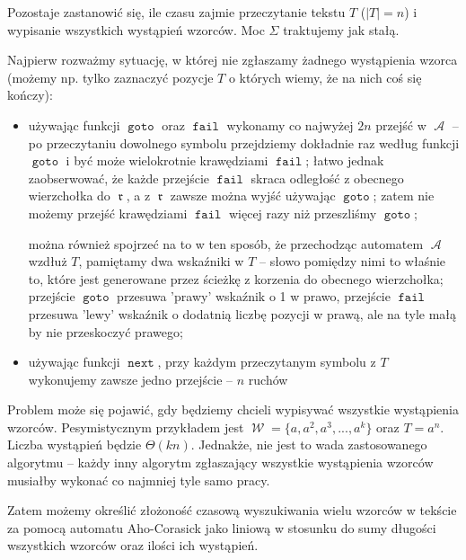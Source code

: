 \documentclass{article}
\DeclareMathOperator{\rot}{\mathfrak{r}}
\DeclareMathOperator{\W}{\mathcal{W}}
\DeclareMathOperator{\A}{\mathcal{A}}
\DeclareMathOperator{\goto}{\texttt{goto}}
\DeclareMathOperator{\next}{\texttt{next}}
\DeclareMathOperator{\fail}{\texttt{fail}}
\begin{document}
Pozostaje zastanowić się, ile czasu zajmie przeczytanie tekstu $T$ ($|T|=n$) i wypisanie wszystkich wystąpień wzorców. Moc $\Sigma$ traktujemy jak stałą.

Najpierw rozważmy sytuację, w której nie zgłaszamy żadnego wystąpienia wzorca (możemy np. tylko zaznaczyć pozycje $T$ o których wiemy, że na nich coś się kończy):
\begin{itemize}
    \item używając funkcji $\goto$ oraz $\fail$ wykonamy co najwyżej $2n$ przejść w $\A$ -- po przeczytaniu dowolnego symbolu przejdziemy dokładnie raz według funkcji $\goto$ i być może wielokrotnie krawędziami $\fail$; łatwo jednak zaobserwować, że każde przejście $\fail$ skraca odległość z obecnego wierzchołka do $\rot$, a z $\rot$ zawsze można wyjść używając $\goto$; zatem nie możemy przejść krawędziami $\fail$ więcej razy niż przeszliśmy $\goto$;

    można również spojrzeć na to w ten sposób, że przechodząc automatem $\A$ wzdłuż $T$, pamiętamy dwa wskaźniki w $T$ -- słowo pomiędzy nimi to właśnie to, które jest generowane przez ścieżkę z korzenia do obecnego wierzchołka; przejście $\goto$ przesuwa 'prawy' wskaźnik o 1 w prawo, przejście $\fail$ przesuwa 'lewy' wskaźnik o dodatnią liczbę pozycji w prawą, ale na tyle małą by nie przeskoczyć prawego;

    \item używając funkcji $\next$, przy każdym przeczytanym symbolu z $T$ wykonujemy zawsze jedno przejście -- $n$ ruchów
\end{itemize}

Problem może się pojawić, gdy będziemy chcieli wypisywać wszystkie wystąpienia wzorców. Pesymistycznym przykładem jest $\W=\{a,a^2,a^3,...,a^k\}$ oraz $T=a^n$. Liczba wystąpień będzie $\Theta(kn)$. Jednakże, nie jest to wada zastosowanego algorytmu -- każdy inny algorytm zgłaszający wszystkie wystąpienia wzorców musiałby wykonać co najmniej tyle samo pracy.

Zatem możemy określić złożoność czasową wyszukiwania wielu wzorców w tekście za pomocą automatu Aho-Corasick jako liniową w stosunku do sumy długości wszystkich wzorców oraz ilości ich wystąpień.
\end{document}
